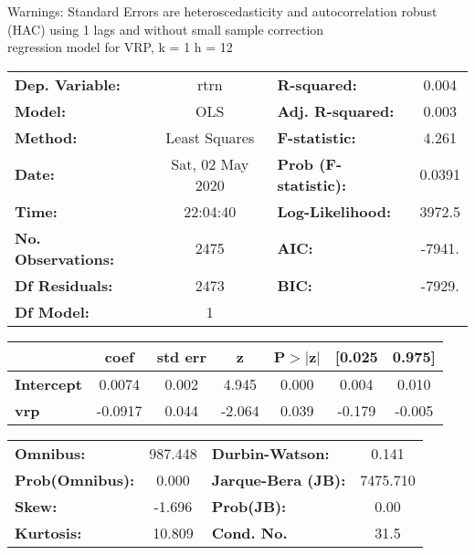 Warnings: \newline
 [1] Standard Errors are heteroscedasticity and autocorrelation robust (HAC) using 1 lags and without small sample correction\\ 

regression model for VRP, k = 1 h = 12\begin{center}
\begin{tabular}{lclc}
\toprule
\textbf{Dep. Variable:}    &       rtrn       & \textbf{  R-squared:         } &     0.004   \\
\textbf{Model:}            &       OLS        & \textbf{  Adj. R-squared:    } &     0.003   \\
\textbf{Method:}           &  Least Squares   & \textbf{  F-statistic:       } &     4.261   \\
\textbf{Date:}             & Sat, 02 May 2020 & \textbf{  Prob (F-statistic):} &   0.0391    \\
\textbf{Time:}             &     22:04:40     & \textbf{  Log-Likelihood:    } &    3972.5   \\
\textbf{No. Observations:} &        2475      & \textbf{  AIC:               } &    -7941.   \\
\textbf{Df Residuals:}     &        2473      & \textbf{  BIC:               } &    -7929.   \\
\textbf{Df Model:}         &           1      & \textbf{                     } &             \\
\bottomrule
\end{tabular}
\begin{tabular}{lcccccc}
                   & \textbf{coef} & \textbf{std err} & \textbf{z} & \textbf{P$> |$z$|$} & \textbf{[0.025} & \textbf{0.975]}  \\
\midrule
\textbf{Intercept} &       0.0074  &        0.002     &     4.945  &         0.000        &        0.004    &        0.010     \\
\textbf{vrp}       &      -0.0917  &        0.044     &    -2.064  &         0.039        &       -0.179    &       -0.005     \\
\bottomrule
\end{tabular}
\begin{tabular}{lclc}
\textbf{Omnibus:}       & 987.448 & \textbf{  Durbin-Watson:     } &    0.141  \\
\textbf{Prob(Omnibus):} &   0.000 & \textbf{  Jarque-Bera (JB):  } & 7475.710  \\
\textbf{Skew:}          &  -1.696 & \textbf{  Prob(JB):          } &     0.00  \\
\textbf{Kurtosis:}      &  10.809 & \textbf{  Cond. No.          } &     31.5  \\
\bottomrule
\end{tabular}
\end{center}

